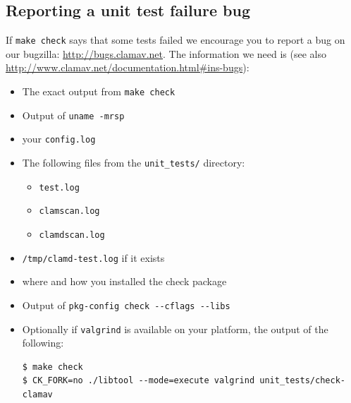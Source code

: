 \documentclass[a4paper,titlepage,12pt]{article}
\begin{document}
    \subsection{Reporting a unit test failure bug}
	If \verb+make check+ says that some tests failed we encourage you to report a bug on our bugzilla: \url{http://bugs.clamav.net}.
	The information we need is (see also \url{http://www.clamav.net/documentation.html#ins-bugs}):
	\begin{itemize}
	 \item The exact output from \verb+make check+	 
	 \item Output of \verb+uname -mrsp+ 
	 \item your \verb+config.log+	 
	 \item The following files from the \verb+unit_tests/+ directory:
		\begin{itemize}
			\item \verb+test.log+
	 		\item \verb+clamscan.log+
			\item \verb+clamdscan.log+
		\end{itemize}
	 \item \verb+/tmp/clamd-test.log+ if it exists
         \item where and how you installed the check package
	 \item Output of \verb+pkg-config check --cflags --libs+
	 \item Optionally if \verb+valgrind+ is available on your platform, the output of the following:
	 \begin{verbatim}
$ make check
$ CK_FORK=no ./libtool --mode=execute valgrind unit_tests/check-clamav
	 \end{verbatim}	
	\end{itemize}
\end{document}
